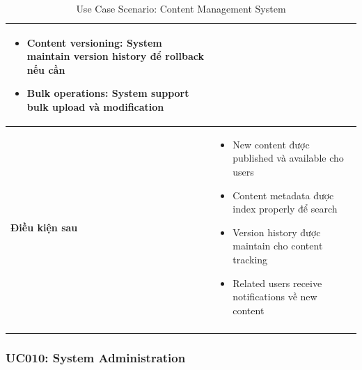 \begin{longtable}{|p{4cm}|p{10cm}|}
\begin{itemize}
    \item Content versioning: System maintain version history để rollback nếu cần
    \item Bulk operations: System support bulk upload và modification
\end{itemize} \\ \hline
\textbf{Điều kiện sau} & 
\begin{itemize}
    \item New content được published và available cho users
    \item Content metadata được index properly để search
    \item Version history được maintain cho content tracking
    \item Related users receive notifications về new content
\end{itemize} \\ \hline
\caption{Use Case Scenario: Content Management System}
\label{tab:uc009} \\
\end{longtable}

\subsubsection{UC010: System Administration}

